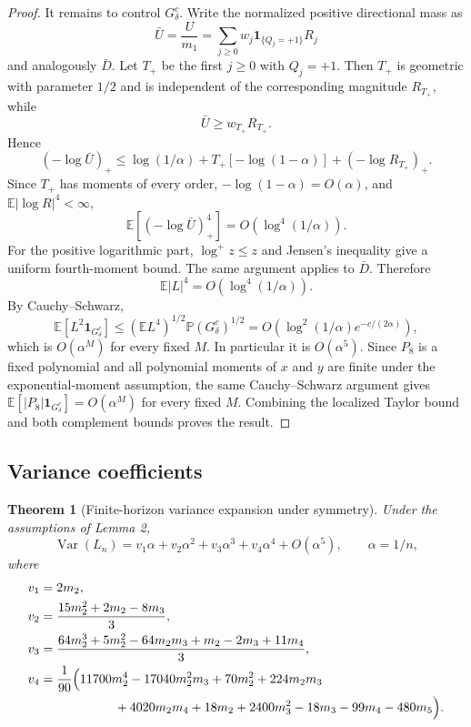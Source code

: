 \documentclass[11pt]{article}
\newtheorem{theorem}{Theorem}
\newcommand{\E}{\mathbb E}
\newcommand{\Var}{\operatorname{Var}}
\newcommand{\Prob}{\mathbb P}
\begin{document}
\begin{proof}
It remains to control $G_\delta^c$. Write the normalized positive directional mass as
\begin{equation}
\bar U=\frac{U}{m_1}=\sum_{j\ge0}w_j\mathbf 1_{\{Q_j=+1\}}R_j
\end{equation}
and analogously $\bar D$. Let $T_+$ be the first $j\ge0$ with $Q_j=+1$. Then $T_+$ is geometric with parameter $1/2$ and is independent of the corresponding magnitude $R_{T_+}$, while
\begin{equation}
\bar U\ge w_{T_+}R_{T_+}.
\end{equation}
Hence
\begin{equation}
(-\log\bar U)_+
\le \log(1/\alpha)+T_+[-\log(1-\alpha)]+(-\log R_{T_+})_+.
\end{equation}
Since $T_+$ has moments of every order, $-\log(1-\alpha)=O(\alpha)$, and $\E|\log R|^4<\infty$,
\begin{equation}
\E[(-\log\bar U)_+^4]=O(\log^4(1/\alpha)).
\end{equation}
For the positive logarithmic part, $\log^+z\le z$ and Jensen's inequality give a uniform fourth-moment bound. The same argument applies to $\bar D$. Therefore
\begin{equation}
\E|L|^4=O(\log^4(1/\alpha)).
\end{equation}
By Cauchy--Schwarz,
\begin{equation}
\E[L^2\mathbf 1_{G_\delta^c}]
\le (\E L^4)^{1/2}\Prob(G_\delta^c)^{1/2}
=O\!\left(\log^2(1/\alpha)e^{-c/(2\alpha)}\right),
\end{equation}
which is $O(\alpha^M)$ for every fixed $M$. In particular it is $O(\alpha^5)$. Since $P_8$ is a fixed polynomial and all polynomial moments of $x$ and $y$ are finite under the exponential-moment assumption, the same Cauchy--Schwarz argument gives $\E[|P_8|\mathbf 1_{G_\delta^c}]=O(\alpha^M)$ for every fixed $M$. Combining the localized Taylor bound and both complement bounds proves the result.
\end{proof}

\subsection{Variance coefficients}
\begin{theorem}[Finite-horizon variance expansion under symmetry]
Under the assumptions of Lemma 2,
\begin{equation}
\boxed{
\Var(L_n)=v_1\alpha+v_2\alpha^2+v_3\alpha^3+v_4\alpha^4+O(\alpha^5),
\qquad \alpha=1/n,}
\end{equation}
where
\begin{align}
v_1={}&2m_2,\\
v_2={}&\frac{15m_2^2+2m_2-8m_3}{3},\\
v_3={}&\frac{64m_2^3+5m_2^2-64m_2m_3+m_2-2m_3+11m_4}{3},\\
v_4={}&\frac{1}{90}\Bigl(
11700m_2^4-17040m_2^2m_3+70m_2^2+224m_2m_3\\
&\hspace{1.6cm}+4020m_2m_4+18m_2+2400m_3^2-18m_3-99m_4-480m_5
\Bigr).
\end{align}
\end{theorem}
\end{document}

